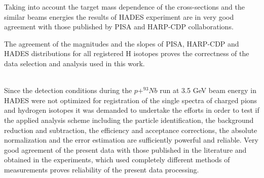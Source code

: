 Taking into account the target mass dependence of the 
cross-sections and the similar beams energies the results of HADES 
experiment are in very good agreement with those published by PISA and HARP-CDP collaborations.

The agreement of the magnitudes and the slopes of PISA, HARP-CDP and HADES distributions 
for all registered H isotopes proves the correctness of the 
data selection and analysis used in this work. 

 \ \\

Since the detection conditions during the $p+^{93}Nb$ run at 3.5 GeV beam energy in HADES were 
not optimized for registration of the single spectra of charged pions and hydrogen isotopes it was demanded to undertake the 
efforts in order to test if the applied analysis scheme 
including the particle identification, the background reduction and subtraction, 
the efficiency and acceptance corrections, the absolute normalization and the error 
estimation are sufficiently powerful and reliable. 
Very good agreement of the present data with those published in the literature and obtained in the experiments, 
which used completely different methods of measurements 
proves reliability of the present data processing.







